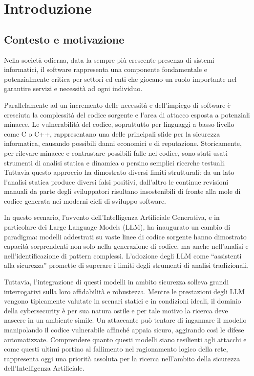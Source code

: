 \chapter{Introduzione}

\section{Contesto e motivazione}
Nella società odierna, data la sempre più crescente presenza di sistemi informatici, il software rappresenta una componente fondamentale e potenzialmente critica per settori ed enti che giocano un ruolo importante nel garantire servizi e necessità ad ogni individuo.

Parallelamente ad un incremento delle necessità e dell'impiego di software è cresciuta la complessità del codice sorgente e l'area di attacco esposta a potenziali minacce.
Le vulnerabilità del codice, soprattutto per linguaggi a basso livello come C o C++, rappresentano una delle principali sfide per la sicurezza informatica, causando possibili danni economici e di reputazione.
Storicamente, per rilevare minacce e contrastare possibili falle nel codice, sono stati usati strumenti di analisi statica e dinamica o persino semplici ricerche testuali.
Tuttavia questo approccio ha dimostrato diversi limiti strutturali: da un lato l'analisi statica produce diversi falsi positivi, dall'altro le continue revisioni manuali da parte degli sviluppatori risultano insostenibili di fronte alla mole di codice generata nei moderni cicli di sviluppo software.

In questo scenario, l'avvento dell'Intelligenza Artificiale Generativa, e in particolare dei Large Language Models (LLM), ha inaugurato un cambio di paradigma: modelli addestrati su vaste linee di codice sorgente hanno dimostrato capacità sorprendenti non solo nella generazione di codice, ma anche nell'analisi e nell'identificazione di pattern complessi. L'adozione degli LLM come \enquote{assistenti alla sicurezza} promette di superare i limiti degli strumenti di analisi tradizionali.

Tuttavia, l'integrazione di questi modelli in ambito sicurezza solleva grandi interrogativi sulla loro affidabilità e robustezza. Mentre le prestazioni degli LLM vengono tipicamente valutate in scenari statici e in condizioni ideali, il dominio della cybersecurity è per sua natura ostile e per tale motivo la ricerca deve nascere in un ambiente simile. Un attaccante può tentare di ingannare il modello manipolando il codice vulnerabile affinché appaia sicuro, aggirando così le difese automatizzate. Comprendere quanto questi modelli siano resilienti agli attacchi e come questi ultimi portino al fallimento nel ragionamento logico della rete, rappresenta oggi una priorità assoluta per la ricerca nell'ambito della sicurezza dell'Intelligenza Artificiale.

